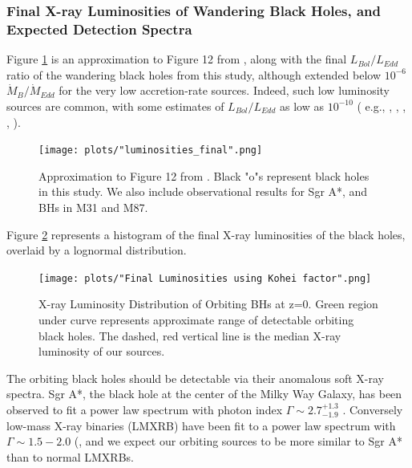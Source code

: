 \documentclass[fleqn,usenatbib,useAMS]{mnras}
\begin{document}
\subsubsection{Final X-ray Luminosities of Wandering Black Holes, and Expected Detection Spectra}
Figure \ref{fig:loobhs} is an approximation to Figure 12 from \cite{2019MNRAS.486.5377I}, along with the final $L_{Bol}/L_{Edd}$ ratio of the wandering black holes from this study, although extended below $10^{-6}$ $\dot{M}_{B}/\dot{M}_{Edd}$ for the very low accretion-rate sources.  Indeed, such low luminosity sources are common, with some estimates of $L_{Bol}/L_{Edd}$ as low as $10^{-10}$ ( e.g., \citealt{2003ApJ...598..301Y}, \citealt{2004ApJ...613..322Q}, \citealt{2008ARA&A..46..475H}, \citealt{2009ApJ...699..626H}, \citealt{2018MNRAS.476.1412I}).
\begin{figure}
\begin{center}
\texttt{[image: plots/"luminosities\_final".png]}
\caption{Approximation to Figure 12 from \citealt{2019MNRAS.486.5377I}. Black "o"s represent black holes in this study.  We also include observational results for Sgr A*, and BHs in M31 and M87.}
\label{fig:loobhs}
\end{center}
\end{figure}

Figure \ref{fig:ldobhs} represents a histogram of the final X-ray luminosities of the black holes, overlaid by a lognormal distribution.  
\begin{figure}
\begin{center}
\texttt{[image: plots/"Final Luminosities using Kohei factor".png]}
\caption{X-ray Luminosity Distribution of Orbiting BHs at z=0.  Green region under curve represents approximate range of detectable orbiting black holes. The dashed, red vertical line is the median X-ray luminosity of our sources.}
\label{fig:ldobhs}
\end{center}
\end{figure}

The orbiting black holes should be detectable via their anomalous soft X-ray spectra.  Sgr A*, the black hole at the center of the Milky Way Galaxy, has been observed to fit a power law spectrum with photon index $\Gamma\sim2.7^{+1.3}_{-1.9}$ \citet{2003ApJ...591..891B}.  Conversely low-mass X-ray binaries (LMXRB) have been fit to a power law spectrum with $\Gamma\sim1.5-2.0$ (\citet{2018Natur.556...70H}, and we expect our orbiting sources to be more similar to Sgr A* than to normal LMXRBs.
\end{document}
